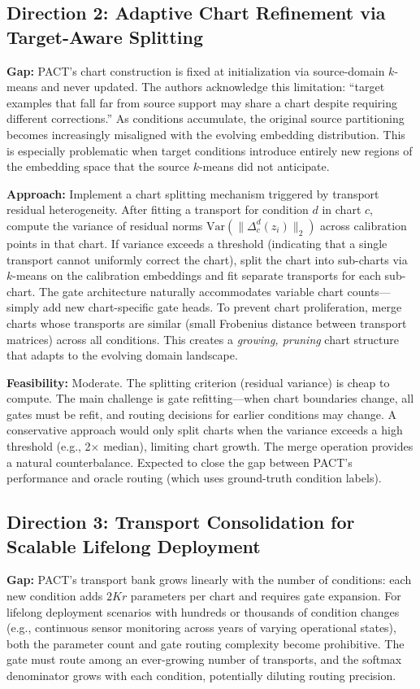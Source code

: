 \documentclass[11pt,a4paper]{article}
\begin{document}
\subsection{Direction 2: Adaptive Chart Refinement via Target-Aware Splitting}
\textbf{Gap:} PACT's chart construction is fixed at initialization via source-domain $k$-means and never updated. The authors acknowledge this limitation: ``target examples that fall far from source support may share a chart despite requiring different corrections.'' As conditions accumulate, the original source partitioning becomes increasingly misaligned with the evolving embedding distribution. This is especially problematic when target conditions introduce entirely new regions of the embedding space that the source $k$-means did not anticipate.

\textbf{Approach:} Implement a chart splitting mechanism triggered by transport residual heterogeneity. After fitting a transport for condition $d$ in chart $c$, compute the variance of residual norms $\text{Var}(\|\Delta_c^d(z_i)\|_2)$ across calibration points in that chart. If variance exceeds a threshold (indicating that a single transport cannot uniformly correct the chart), split the chart into sub-charts via $k$-means on the calibration embeddings and fit separate transports for each sub-chart. The gate architecture naturally accommodates variable chart counts---simply add new chart-specific gate heads. To prevent chart proliferation, merge charts whose transports are similar (small Frobenius distance between transport matrices) across all conditions. This creates a \emph{growing, pruning} chart structure that adapts to the evolving domain landscape.

\textbf{Feasibility:} Moderate. The splitting criterion (residual variance) is cheap to compute. The main challenge is gate refitting---when chart boundaries change, all gates must be refit, and routing decisions for earlier conditions may change. A conservative approach would only split charts when the variance exceeds a high threshold (e.g., 2$\times$ median), limiting chart growth. The merge operation provides a natural counterbalance. Expected to close the gap between PACT's performance and oracle routing (which uses ground-truth condition labels).

\subsection{Direction 3: Transport Consolidation for Scalable Lifelong Deployment}
\textbf{Gap:} PACT's transport bank grows linearly with the number of conditions: each new condition adds $2Kr$ parameters per chart and requires gate expansion. For lifelong deployment scenarios with hundreds or thousands of condition changes (e.g., continuous sensor monitoring across years of varying operational states), both the parameter count and gate routing complexity become prohibitive. The gate must route among an ever-growing number of transports, and the softmax denominator grows with each condition, potentially diluting routing precision.
\end{document}
